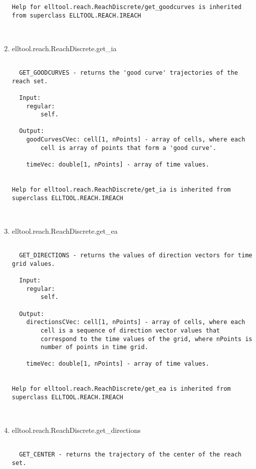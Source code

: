 \begin{enumerate}
\begin{lstlisting}
Help for elltool.reach.ReachDiscrete/get_goodcurves is inherited from superclass ELLTOOL.REACH.IREACH



\end{lstlisting}
\fontfamily{\familydefault}
\selectfont
\item {elltool.reach.ReachDiscrete.get\_ia}
\selectfont
\begin{lstlisting}

  GET_GOODCURVES - returns the 'good curve' trajectories of the reach set.

  Input:
    regular:
        self.

  Output:
    goodCurvesCVec: cell[1, nPoints] - array of cells, where each
        cell is array of points that form a 'good curve'.

    timeVec: double[1, nPoints] - array of time values.


Help for elltool.reach.ReachDiscrete/get_ia is inherited from superclass ELLTOOL.REACH.IREACH



\end{lstlisting}
\fontfamily{\familydefault}
\selectfont
\item {elltool.reach.ReachDiscrete.get\_ea}
\selectfont
\begin{lstlisting}

  GET_DIRECTIONS - returns the values of direction vectors for time grid values.

  Input:
    regular:
        self.

  Output:
    directionsCVec: cell[1, nPoints] - array of cells, where each
        cell is a sequence of direction vector values that
        correspond to the time values of the grid, where nPoints is
        number of points in time grid.

    timeVec: double[1, nPoints] - array of time values.


Help for elltool.reach.ReachDiscrete/get_ea is inherited from superclass ELLTOOL.REACH.IREACH



\end{lstlisting}
\fontfamily{\familydefault}
\selectfont
\item {elltool.reach.ReachDiscrete.get\_directions}
\selectfont
\begin{lstlisting}

  GET_CENTER - returns the trajectory of the center of the reach set.


\end{lstlisting}
\end{enumerate}
